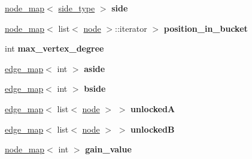 \begin{DoxyCompactItemize}
\item 
\mbox{\label{classratio__cut__partition_a2bf913d1d8607747885177a3b585e611}} 
\mbox{\hyperlink{classnode__map}{node\+\_\+map}}$<$ \mbox{\hyperlink{classratio__cut__partition_ace53442bd0c1e21fbf00858ec6f6b456}{side\+\_\+type}} $>$ {\bfseries side}
\item 
\mbox{\label{classratio__cut__partition_af22e9f52fdde7bfecbadd5446dc523a3}} 
\mbox{\hyperlink{classnode__map}{node\+\_\+map}}$<$ list$<$ \mbox{\hyperlink{classnode}{node}} $>$\+::iterator $>$ {\bfseries position\+\_\+in\+\_\+bucket}
\item 
\mbox{\label{classratio__cut__partition_ab07041983ab24ac059e8c98192c146e4}} 
int {\bfseries max\+\_\+vertex\+\_\+degree}
\item 
\mbox{\label{classratio__cut__partition_a112bfcfb9d05d5bbdeb29576a61399e1}} 
\mbox{\hyperlink{classedge__map}{edge\+\_\+map}}$<$ int $>$ {\bfseries aside}
\item 
\mbox{\label{classratio__cut__partition_ab9c1166efb1cbb65ff6c55bb6e3c9e6d}} 
\mbox{\hyperlink{classedge__map}{edge\+\_\+map}}$<$ int $>$ {\bfseries bside}
\item 
\mbox{\label{classratio__cut__partition_a45966fb7dc3624c3829c8b0f7a389379}} 
\mbox{\hyperlink{classedge__map}{edge\+\_\+map}}$<$ list$<$ \mbox{\hyperlink{classnode}{node}} $>$ $>$ {\bfseries unlockedA}
\item 
\mbox{\label{classratio__cut__partition_a6a3e407a15a02ddfc39ca42399f7b54a}} 
\mbox{\hyperlink{classedge__map}{edge\+\_\+map}}$<$ list$<$ \mbox{\hyperlink{classnode}{node}} $>$ $>$ {\bfseries unlockedB}
\item 
\mbox{\label{classratio__cut__partition_af24ff191abbb0578f0bfc54fef5f6d45}} 
\mbox{\hyperlink{classnode__map}{node\+\_\+map}}$<$ int $>$ {\bfseries gain\+\_\+value}
\item 
\mbox{\label{classratio__cut__partition_a2e3f25066f798f28e9e5646f866ffc1c}} 

\end{DoxyCompactItemize}
